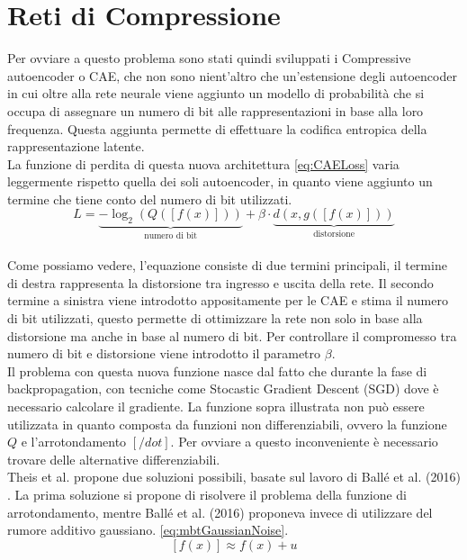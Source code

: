 \section{Reti di Compressione}
Per ovviare a questo problema sono stati quindi sviluppati i Compressive autoencoder o CAE, che non sono nient’altro che un’estensione degli autoencoder in cui oltre alla rete neurale viene aggiunto un modello di probabilità che si occupa di assegnare un numero di bit alle rappresentazioni in base alla loro frequenza. Questa aggiunta permette di effettuare la codifica entropica della rappresentazione latente. \cite{theis2017lossy}\\
La funzione di perdita di questa nuova architettura \ref{eq:CAELoss} varia leggermente rispetto quella dei soli autoencoder, in quanto viene aggiunto un termine che tiene conto del numero di bit utilizzati. 
\begin{equation}\label{eq:CAELoss}
    L = \underbrace{- \log_{2}(Q([f(x)]))}_{\textrm{numero di bit}} + \beta \cdot \underbrace{d(x,g([f(x)]))}_{\textrm{distorsione}}
\end{equation}\\
Come possiamo vedere, l’equazione consiste di due termini principali, il termine di destra rappresenta la distorsione tra ingresso e uscita della rete. Il secondo termine a sinistra viene introdotto appositamente per le CAE e stima il numero di bit utilizzati, questo permette di ottimizzare la rete non solo in base alla distorsione ma anche in base al numero di bit. Per controllare il compromesso tra numero di bit e distorsione viene introdotto il parametro $\beta$.\\
Il problema con questa nuova funzione nasce dal fatto che durante la fase di backpropagation, con tecniche come Stocastic Gradient Descent (SGD) dove è necessario calcolare il gradiente. La funzione sopra illustrata non può essere utilizzata in quanto composta da funzioni non differenziabili, ovvero la funzione $Q$ e l’arrotondamento $[/dot]$. Per ovviare a questo inconveniente è necessario trovare delle alternative differenziabili.\\
Theis et al. \cite{theis2017lossy} propone due soluzioni possibili, basate sul lavoro di Ballé et al. (2016) \cite{balle2018variational}. La prima soluzione si propone di risolvere il problema della funzione di arrotondamento, mentre Ballé et al. (2016) proponeva invece di utilizzare del rumore additivo gaussiano. \ref{eq:mbtGaussianNoise}.\\
\begin{equation}\label{eq:mbtGaussianNoise}
    [f(x)] \approx f(x) + u
\end{equation}\\

